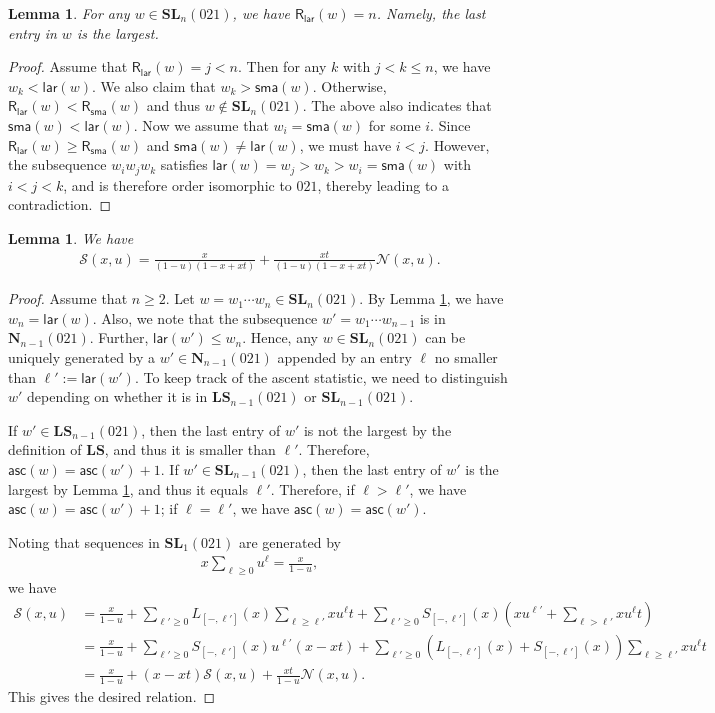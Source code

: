 \documentclass[reqno]{amsart}
\numberwithin{equation}{section}
\theoremstyle{plain}
\newtheorem{lemma}[theorem]{Lemma}
\theoremstyle{definition}
\theoremstyle{named}
\newcommand{\bN}{\mathbf{N}}
\newcommand{\bSL}{\mathbf{SL}}
\newcommand{\bLS}{\mathbf{LS}}
\newcommand{\asc}{\mathsf{asc}}
\newcommand{\lar}{\mathsf{lar}}
\newcommand{\sma}{\mathsf{sma}}
\newcommand{\RLAR}{\mathsf{R}_{\mathsf{lar}}}
\newcommand{\RSMA}{\mathsf{R}_{\mathsf{sma}}}
\newcommand{\cN}{\mathcal{N}}
\newcommand{\cSL}{\mathcal{S}}
\newcommand{\coSL}{S}
\newcommand{\coLS}{L}
\begin{document}
\begin{lemma}\label{le:SL(021)}
	For any $w\in\bSL_n(021)$, we have $\RLAR(w)=n$. Namely, the last entry in $w$ is the largest.
\end{lemma}

\begin{proof}
	Assume that $\RLAR(w)=j<n$. Then for any $k$ with $j<k\le n$, we have $w_k<\lar(w)$. We also claim that $w_k>\sma(w)$. Otherwise, $\RLAR(w)< \RSMA(w)$ and thus $w\not\in \bSL_n(021)$. The above also indicates that $\sma(w)<\lar(w)$. Now we assume that $w_i=\sma(w)$ for some $i$. Since $\RLAR(w)\ge \RSMA(w)$ and $\sma(w)\ne\lar(w)$, we must have $i<j$. However, the subsequence $w_iw_jw_k$ satisfies $\lar(w)=w_j>w_k>w_i=\sma(w)$ with $i<j<k$, and is therefore order isomorphic to $021$, thereby leading to a contradiction.
\end{proof}

\begin{lemma}\label{le:SL-func-eqn}
	We have
	\begin{align}\label{eq:SL-func-eqn}
		\cSL(x,u)=\frac{x}{(1-u)(1-x+xt)}+\frac{xt}{(1-u)(1-x+xt)} \cN(x,u).
	\end{align}
\end{lemma}

\begin{proof}
	Assume that $n\ge 2$. Let $w=w_1\cdots w_n\in \bSL_n(021)$. By Lemma \ref{le:SL(021)}, we have $w_n=\lar(w)$. Also, we note that the subsequence $w'=w_1\cdots w_{n-1}$ is in $\bN_{n-1}(021)$. Further, $\lar(w')\le w_n$. Hence, any $w\in \bSL_n(021)$ can be uniquely generated by a $w'\in\bN_{n-1}(021)$ appended by an entry $\ell$ no smaller than $\ell':=\lar(w')$. To keep track of the ascent statistic, we need to distinguish $w'$ depending on whether it is in $\bLS_{n-1}(021)$ or $\bSL_{n-1}(021)$.
	
	If $w'\in \bLS_{n-1}(021)$, then the last entry of $w'$ is not the largest by the definition of $\bLS$, and thus it is smaller than $\ell'$. Therefore, $\asc(w)=\asc(w')+1$. If $w'\in \bSL_{n-1}(021)$, then the last entry of $w'$ is the largest by Lemma \ref{le:SL(021)}, and thus it equals $\ell'$. Therefore, if $\ell>\ell'$, we have $\asc(w)=\asc(w')+1$; if $\ell=\ell'$, we have $\asc(w)=\asc(w')$.
	
	Noting that sequences in $\bSL_1(021)$ are generated by
	\begin{align*}
		x\sum_{\ell\ge 0}u^\ell = \frac{x}{1-u},
	\end{align*}
	we have
	\begin{align*}
		\cSL(x,u)&=\frac{x}{1-u}+\sum_{\ell'\ge 0}\coLS_{[-,\ell']}(x)\sum_{\ell\ge \ell'}xu^{\ell}t + \sum_{\ell'\ge 0}\coSL_{[-,\ell']}(x)\left(xu^{\ell'}+\sum_{\ell> \ell'}xu^{\ell}t\right)\\
		&=\frac{x}{1-u}+ \sum_{\ell'\ge 0}\coSL_{[-,\ell']}(x)u^{\ell'}(x-xt) +\sum_{\ell'\ge 0}\left(\coLS_{[-,\ell']}(x)+\coSL_{[-,\ell']}(x)\right)\sum_{\ell\ge \ell'}xu^{\ell}t\\
		&=\frac{x}{1-u}+ (x-xt)\cSL(x,u)+\frac{xt}{1-u} \cN(x,u).
	\end{align*}
	This gives the desired relation.
\end{proof}
\end{document}
